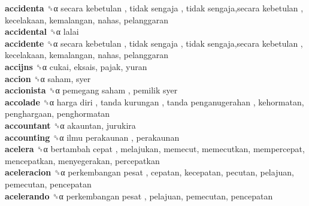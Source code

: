 \textbf{accidenta} ␝α   secara kebetulan ,  tidak sengaja ,  tidak sengaja,secara kebetulan , kecelakaan, kemalangan, nahas, pelanggaran  \\
\textbf{accidental} ␝α  lalai  \\
\textbf{accidente} ␝α   secara kebetulan ,  tidak sengaja ,  tidak sengaja,secara kebetulan , kecelakaan, kemalangan, nahas, pelanggaran  \\
\textbf{accijns} ␝α  cukai, eksais, pajak, yuran  \\
\textbf{accion} ␝α  saham, syer  \\
\textbf{accionista} ␝α   pemegang saham ,  pemilik syer   \\
\textbf{accolade} ␝α   harga diri ,  tanda kurungan ,  tanda penganugerahan , kehormatan, penghargaan, penghormatan  \\
\textbf{accountant} ␝α  akauntan, jurukira  \\
\textbf{accounting} ␝α   ilmu perakaunan , perakaunan  \\
\textbf{acelera} ␝α   bertambah cepat , melajukan, memecut, memecutkan, mempercepat, mencepatkan, menyegerakan, percepatkan  \\
\textbf{aceleracion} ␝α   perkembangan pesat , cepatan, kecepatan, pecutan, pelajuan, pemecutan, pencepatan  \\
\textbf{acelerando} ␝α   perkembangan pesat , pelajuan, pemecutan, pencepatan  \\

